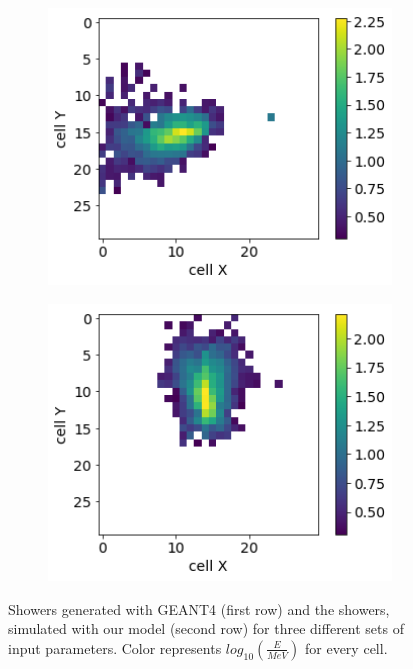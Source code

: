 \documentclass{PoS}
\begin{document}
\begin{figure}
\begin{subfigure}{0.24\textwidth}
    \includegraphics[width=1\textwidth]{figures/3_gen.png}
  \end{subfigure}
  \begin{subfigure}{0.24\textwidth}
    \centering
    \includegraphics[width=1\textwidth]{figures/4_gen.png}
  \end{subfigure}
   \caption{Showers generated with GEANT4 (first row) and the showers,
    simulated with our model (second row) for three different sets of
    input parameters. Color represents $log_{10}(\frac{E}{MeV})$ for every cell.}
  \label{fig:geant_vs_ours}
\end{figure}
\end{document}
